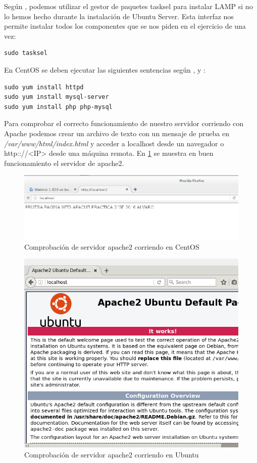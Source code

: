 Según \cite{tasksel}, podemos utilizar el gestor de paquetes tasksel para instalar LAMP si no lo hemos hecho durante la instalación de Ubuntu Server. Esta interfaz nos permite instalar todos los componentes que se nos piden en el ejercicio de una vez:

\begin{verbatim}
sudo tasksel
\end{verbatim}

En CentOS se deben ejecutar las siguientes sentencias según \cite{phpinstall}, \cite{apacheinstall} y \cite{mysqlinstall}:

\begin{verbatim}
sudo yum install httpd
sudo yum install mysql-server
sudo yum install php php-mysql
\end{verbatim}

Para comprobar el correcto funcionamiento de nuestro servidor corriendo con Apache podemos crear un archivo de texto con un mensaje de prueba en \textit{/var/www/html/index.html} y acceder a localhost desde un navegador o http:://<IP> desde una máquina remota. En \ref{ise15} se muestra en buen funcionamiento el servidor de apache2.

\begin{figure}[H]
	\centering
	\includegraphics[scale=0.6]{ise15.png}
	\caption{Comprobación de servidor apache2 corriendo en CentOS} \label{ise15}
\end{figure}

\begin{figure}[H]
	\centering
	\includegraphics[scale=0.6]{ise16.png}
	\caption{Comprobación de servidor apache2 corriendo en Ubuntu} \label{ise16}
\end{figure}


